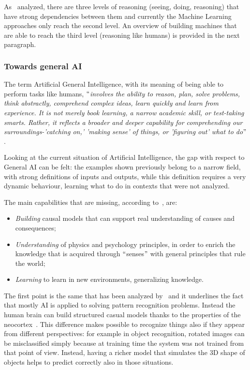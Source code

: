 As~\cite{pearl2018theoretical} analyzed, there are three levels of reasoning (seeing, doing, reasoning) that have strong dependencies between them and currently the Machine Learning approaches only reach the second level. An overview of building machines that are able to reach the third level (reasoning like humans) is provided in the next paragraph.

\subsubsection{Towards general AI}
\label{generalAI}

The term Artificial General Intelligence, with its meaning of being able to perform tasks like humans, $``$\textit{involves the ability to reason, plan, solve problems, think abstractly, comprehend complex ideas, learn quickly and learn from experience. It is not merely book learning, a narrow academic skill, or test-taking smarts. Rather, it reflects a broader and deeper capability for comprehending our surroundings-'catching on,' 'making sense' of things, or 'figuring out' what to do}$"$ .~\cite{gottfredson1997mainstream}

Looking at the current situation of Artificial Intelligence, the gap with respect to General AI can be felt: the examples shown previously belong to a narrow field, with strong definitions of inputs and outputs, while this definition requires a very dynamic behaviour, learning what to do in contexts that were not analyzed.

The main capabilities that are missing, according to~\cite{lake2017building}, are:

\begin{itemize}
	\item \textit{Building} causal models that can support real understanding of causes and consequences;

	\item \textit{Understanding} of physics and psychology principles, in order to enrich the knowledge that is acquired through $``$senses$"$  with general principles that rule the world;

	\item \textit{Learning} to learn in new environments, generalizing knowledge.
\end{itemize}

The first point is the same that has been analyzed by~\cite{pearl2018theoretical} and it underlines the fact that mostly AI is applied to solving pattern recognition problems. Instead the human brain can build structured casual models thanks to the properties of the neocortex~\cite{hawkins2017theory}. This difference makes possible to recognize things also if they appear from different perspectives: for example in object recognition, rotated images can be misclassified simply because at training time the system was not trained from that point of view. Instead, having a richer model that simulates the 3D shape of objects helps to predict correctly also in those situations.

